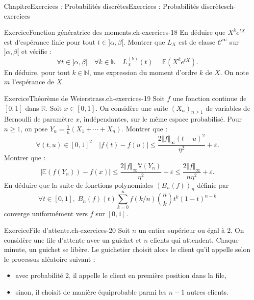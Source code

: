 \documentclass[twoside,10pt,]{book}
\numberwithin{equation}{chapter}
\newcommand{\N}{\mathbb N}
\newcommand{\R}{\mathbb R}
\newcommand{\Es}{\mathbb E}
\newcommand{\Va}{\mathbb V}
\begin{document}
\begin{chapterptx}{Chapitre}{Exercices : Probabilités discrètes}{}{Exercices : Probabilités discrètes}{}{}{ch-exercices}
\begin{inlineexercise}{Exercice}{Fonction génératrice des moments.}{ch-exercices-18}
En déduire que \(X^{k} e^{t X}\) est d'espérance finie pour tout \(t \in ]\alpha, \beta[\).%
Montrer que \(L_{X}\) est de classe \(\mathcal{C}^{\infty}\) sur \(]\alpha, \beta[\) et vérifie :%
\begin{equation*}
\forall t \in ]\alpha, \beta[ \quad \forall k \in \N \quad L_{X}^{(k)}(t) = \Es(X^{k} e^{t X}).
\end{equation*}
En déduire, pour tout \(k \in \N\), une expression du moment d'ordre \(k\) de \(X\). On note \(m\) l'espérance de \(X\).%
\end{inlineexercise}%
\begin{inlineexercise}{Exercice}{Théorème de Weierstrass.}{ch-exercices-19}%
Soit \(f\) une fonction continue de \([0, 1]\) dans \(\R\). Soit \(x \in [0, 1]\). On considère une suite \((X_{n})_{n \geqslant 1}\) de variables de Bernoulli de paramètre \(x\), indépendantes, sur le même espace probabilisé. Pour \(n \geqslant 1\), on pose \(Y_{n} = \frac1n(X_{1} + \cdots + X_{n})\).%
Montrer que :%
\begin{equation*}
\forall(t, u) \in [0, 1]^{2} \quad |f(t) - f(u)| \leqslant \frac{2 \Vert f \Vert _{\infty} (t - u)^{2}}{\eta^{2}} + \varepsilon.
\end{equation*}
%
Montrer que :%
\begin{equation*}
\left|\Es(f(Y_{n})) - f(x)\right| \leqslant \frac{2 \Vert f \Vert _{\infty} \Va(Y_{n})}{\eta^{2}} + \varepsilon \leqslant \frac{2 \Vert f \Vert _{\infty}}{n \eta^{2}} + \varepsilon.
\end{equation*}
%
En déduire que la suite de fonctions polynomiales \((B_n(f))_n\) définie par%
\begin{equation*}
\forall t\in[0,1],\;
B_n(f)(t)\sum_{k=0}^nf(k/n)\binom{n}{k}t^k(1-t)^{n-k}
\end{equation*}
converge uniformément vers \(f\) sur \([0,1]\).%
\end{inlineexercise}%
\begin{inlineexercise}{Exercice}{File d'attente.}{ch-exercices-20}%
Soit \(n\) un entier supérieur ou égal à 2. On considère une file d'attente avec un guichet et \(n\) clients qui attendent. Chaque minute, un guichet se libère. Le guichetier choisit alors le client qu'il appelle selon le processus aléatoire suivant :%
\begin{itemize}[label=\textbullet]
\item{}avec probabilité 2, il appelle le client en première position dans la file,%
\item{}sinon, il choisit de manière équiprobable parmi les \(n - 1\) autres clients.%

\end{itemize}
\end{inlineexercise}
\end{chapterptx}
\end{document}

